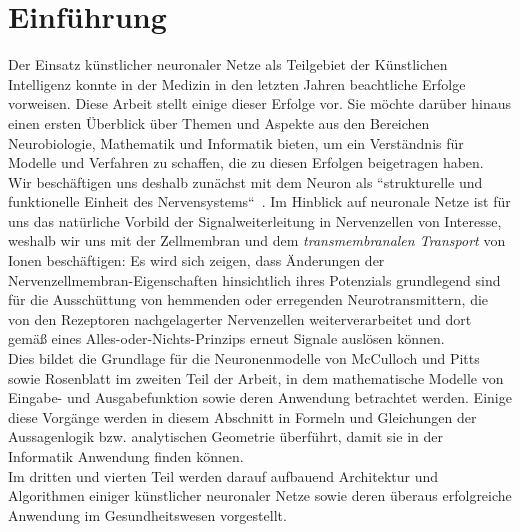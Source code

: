 \chapter{Einführung}

Der Einsatz künstlicher neuronaler Netze als Teilgebiet der Künstlichen Intelligenz konnte in der Medizin in den letzten Jahren beachtliche Erfolge vorweisen.
Diese Arbeit stellt einige dieser Erfolge vor.
Sie möchte darüber hinaus einen ersten Überblick über Themen und Aspekte aus den Bereichen Neurobiologie, Mathematik und Informatik bieten, um ein Verständnis für Modelle und Verfahren zu schaffen, die zu diesen Erfolgen beigetragen haben.\\

Wir beschäftigen uns deshalb zunächst mit dem Neuron als ``strukturelle und funktionelle Einheit des Nervensystems``~\cite[42]{SD07}.
Im Hinblick auf neuronale Netze ist für uns das natürliche Vorbild der Signalweiterleitung in Nervenzellen von Interesse, weshalb wir uns mit der Zellmembran und dem \textit{transmembranalen Transport} von Ionen beschäftigen: Es wird sich zeigen, dass Änderungen der Nervenzellmembran-Eigenschaften hinsichtlich ihres Potenzials grundlegend sind für die Ausschüttung von hemmenden oder erregenden Neurotransmittern, die von den Rezeptoren nachgelagerter Nervenzellen weiterverarbeitet und dort gemäß eines Alles-oder-Nichts-Prinzips erneut Signale auslösen können.\\

Dies bildet die Grundlage für die Neuronenmodelle von McCulloch und Pitts sowie Rosenblatt im zweiten Teil der Arbeit, in dem  mathematische Modelle von Eingabe- und Ausgabefunktion sowie deren Anwendung betrachtet werden.
Einige diese Vorgänge werden in diesem Abschnitt in Formeln und Gleichungen der Aussagenlogik {bzw.} analytischen Geometrie überführt, damit sie in der Informatik Anwendung finden können.\\

Im dritten und vierten Teil werden darauf aufbauend Architektur und Algorithmen einiger künstlicher neuronaler Netze sowie deren überaus erfolgreiche Anwendung im Gesundheitswesen vorgestellt.
